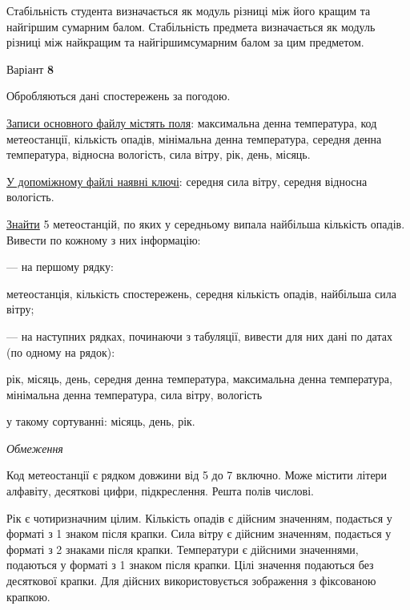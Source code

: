 \documentclass[11pt, ukrainian]{article}
\begin{document}
Стабільність студента визначається як модуль різниці між його кращим та найгіршим сумарним балом.
Стабільність предмета визначається як модуль різниці між найкращим та найгіршимсумарним балом за цим предметом.






\par
\newpage
{\center Варіант  \No \textbf { 8 }\par}
\bigskip
Обробляються дані спостережень за погодою. 

\underline{Записи основного файлу містять поля}: максимальна денна температура, код метеостанції, кількість опадів, мінімальна денна температура, середня денна температура, відносна вологість, сила вітру, рік, день, місяць.

\underline{У допоміжному файлі наявні ключі}: середня сила вітру, середня відносна вологість.

\underline{Знайти} 5 метеостанцій, по яких у середньому випала найбільша кількість опадів. Вивести по кожному з них інформацію:\par
{\noindent}--- на першому рядку:\par
метеостанція, кількість спостережень, середня кількість опадів, найбільша сила вітру;

{\noindent}--- на наступних рядках, починаючи з табуляції, вивести для них дані по датах (по одному на рядок):\par
рік, місяць, день, середня денна температура, максимальна денна температура, мінімальна денна температура, сила вітру, вологість

{\noindent}у такому сортуванні: місяць, день, рік.


\bigskip\textit{Обмеження}

Код метеостанції є рядком довжини від 5 до 7 включно.
Може містити літери алфавіту, десяткові цифри, підкреслення. Решта полів числові.

Рік є чотиризначним цілим.
Кількість опадів є дійсним значенням, подається у форматі з 1 знаком після крапки.
Сила вітру є дійсним значенням, подається у форматі з 2 знаками після крапки.
Температури є дійсними значеннями, подаються у форматі з 1 знаком після крапки.
Цілі значення подаються без десяткової крапки.
Для дійсних використовується зображення з фіксованою крапкою.
\end{document}
